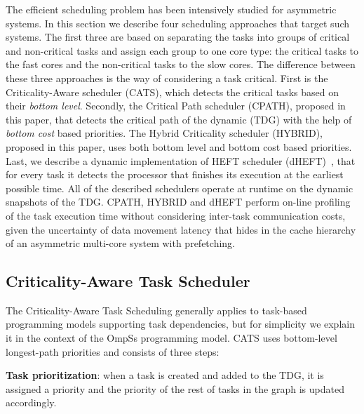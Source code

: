 The efficient scheduling problem has been intensively studied for asymmetric systems.
In this section we describe four scheduling approaches that target such systems.
The first three are based on separating the tasks into groups of critical and non-critical tasks and assign each group to one core type: the critical tasks to the fast cores and the non-critical tasks to the slow cores.
The difference between these three approaches is the way of considering a task critical.
First is the Criticality-Aware scheduler (CATS)\cite{Chronaki:ICS2015}, which detects the critical tasks based on their \textit{bottom level}.
Secondly, the Critical Path scheduler (CPATH), proposed in this paper, that detects the critical path of the dynamic (TDG) with the help of \textit{bottom cost} based priorities.
The Hybrid Criticality scheduler (HYBRID), proposed in this paper, uses both bottom level and bottom cost based priorities.
Last, we describe a dynamic implementation of HEFT scheduler (dHEFT)~\cite{HEFT}, that for every task it detects the processor that finishes its execution at the earliest possible time.
All of the described schedulers operate at runtime on the dynamic snapshots of the TDG. 
CPATH, HYBRID and dHEFT perform on-line profiling of the task execution time without considering inter-task communication costs, given the uncertainty of data movement latency that hides in the cache hierarchy of an asymmetric multi-core system with prefetching. 


\subsection{Criticality-Aware Task Scheduler}
\label{sec.cats}
The Criticality-Aware Task Scheduling generally applies to task-based programming models supporting task dependencies, but for simplicity we explain it in the context of the OmpSs programming model.
CATS uses bottom-level longest-path priorities and consists of three steps:

\textbf{Task prioritization}: when a task is created and added to the TDG, it is assigned a priority and the priority of the rest of tasks in the graph is updated accordingly.

